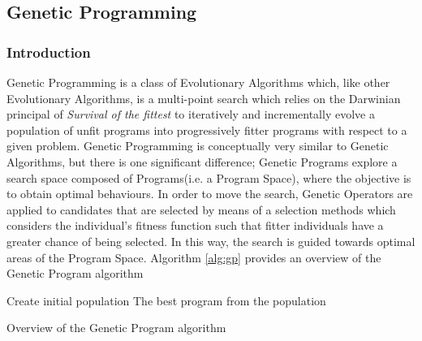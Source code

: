 \documentclass[a4paper,12pt]{article}
\begin{document}
    \subsection{Genetic Programming}
        \subsubsection{Introduction}
            \par{
            Genetic Programming\cite{jkgp} is a class of Evolutionary Algorithms which, like other Evolutionary Algorithms, is a multi-point search which relies on the Darwinian principal of \textit{Survival of the fittest} to iteratively and incrementally evolve a population of unfit programs into progressively fitter programs with respect to a given problem. \newline
            \newline
            Genetic Programming is conceptually very similar to Genetic Algorithms, but there is one significant difference; Genetic Programs explore a search space composed of Programs(i.e. a Program Space), where the objective is to obtain optimal behaviours. \newline
            \newline
            In order to move the search, Genetic Operators are applied to candidates that are selected by means of a selection methods which considers the individual's fitness function such that fitter individuals have a greater chance of being selected. In this way, the search is guided towards optimal areas of the Program Space.\newline
            \newline
            Algorithm \ref{alg:gp} provides an overview of the Genetic Program algorithm\newline
            \newline
            }
            \begin{algorithm}[H]
                \SetAlgoLined
                Create initial population\;
                \Return The best program from the population 
                \caption{Overview of the Genetic Program algorithm}
                \label{alg:gp}
            \end{algorithm} 
\end{document}
